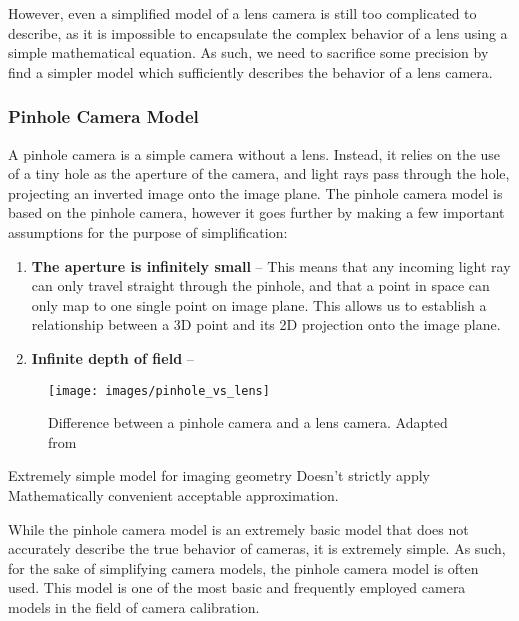 However, even a simplified model of a lens camera is still too complicated to describe, as it is impossible to encapsulate the complex behavior of a lens using a simple mathematical equation. As such, we need to sacrifice some precision by find a simpler model which sufficiently describes the behavior of a lens camera. 

\subsubsection{Pinhole Camera Model}

A pinhole camera is a simple camera without a lens. Instead, it relies on the use of a tiny hole as the aperture of the camera, and light rays pass through the hole, projecting an inverted image onto the image plane. The pinhole camera model is based on the pinhole camera, however it goes further by making a few important assumptions for the purpose of simplification:

\begin{enumerate}[leftmargin=!, itemindent=-5ex]
    \item \textbf{The aperture is infinitely small} -- This means that any incoming light ray can only travel straight through the pinhole, and that a point in space can only map to one single point on image plane. This allows us to establish a relationship between a 3D point and its 2D projection onto the image plane. 
    \item \textbf{Infinite depth of field} -- 
\end{enumerate}
 

\begin{figure}
    \centering
    \texttt{[image: images/pinhole\_vs\_lens]}
    \caption{Difference between a pinhole camera and a lens camera. Adapted from \cite{leCameraModel2018}}
\end{figure}


Extremely simple model for imaging geometry
Doesn't strictly apply
Mathematically convenient acceptable approximation.


While the pinhole camera model is an extremely basic  model that does not accurately describe the true behavior of cameras, it is extremely simple. As such, for the sake of simplifying camera models, the pinhole camera model is often used. This model is one of the most basic and frequently employed camera models in the field of camera calibration. 








